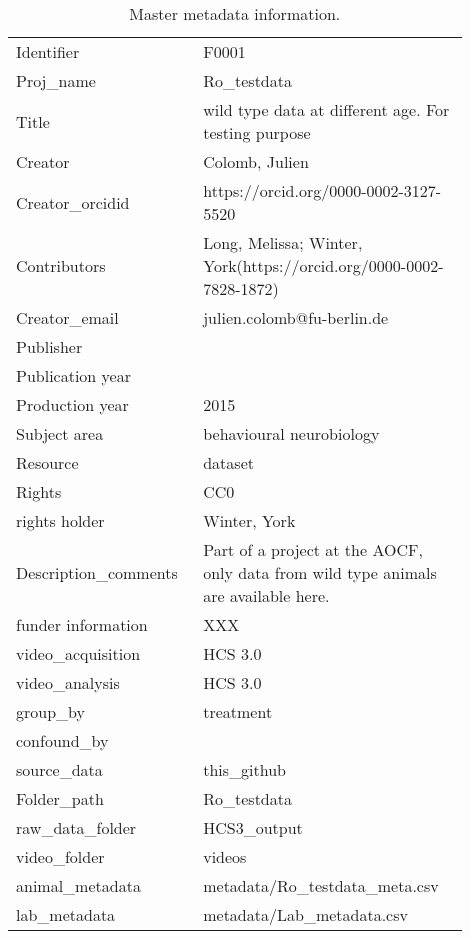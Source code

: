\begin{table}[!htpb]
\centering
\begin{tabular}{|p{0.35\linewidth}|p{0.55\linewidth}|}
  \hline
  \hline
Identifier & F0001 \\ 
  Proj\_name & Ro\_testdata \\ 
  Title & wild type data at different age. For testing purpose \\ 
  Creator & Colomb, Julien \\ 
  Creator\_orcidid & https://orcid.org/0000-0002-3127-5520
 \\ 
  Contributors & Long, Melissa; Winter, York(https://orcid.org/0000-0002-7828-1872) \\ 
  Creator\_email & julien.colomb@fu-berlin.de \\ 
  Publisher &  \\ 
  Publication year &  \\ 
  Production year & 2015 \\ 
  Subject area & behavioural neurobiology \\ 
  Resource & dataset \\ 
  Rights & CC0 \\ 
  rights holder & Winter, York \\ 
  Description\_comments & Part of a project at the AOCF, only data from wild type animals are available here. \\ 
  funder information & XXX \\ 
  video\_acquisition & HCS 3.0 \\ 
  video\_analysis & HCS 3.0 \\ 
  group\_by & treatment \\ 
  confound\_by &  \\ 
  source\_data & this\_github \\ 
  Folder\_path & Ro\_testdata \\ 
  raw\_data\_folder & HCS3\_output \\ 
  video\_folder & videos \\ 
  animal\_metadata & metadata/Ro\_testdata\_meta.csv \\ 
  lab\_metadata & metadata/Lab\_metadata.csv \\ 
   \hline
\end{tabular}
\caption{Master metadata information.} 
\label{tab:project_metadata}
\end{table}
